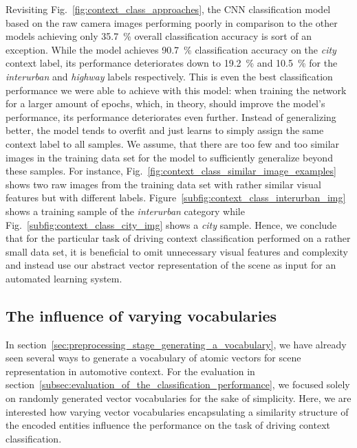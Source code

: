 Revisiting Fig.~\ref{fig:context_class_approaches}, the \ac{CNN} classification model based on the raw camera images performing poorly in comparison to the other models achieving only \SI{35.7}{\percent} overall classification accuracy is sort of an exception.
While the model achieves \SI{90.7}{\percent} classification accuracy on the \emph{city} context label, its performance deteriorates down to \SI{19.2}{\percent} and \SI{10.5}{\percent} for the \emph{interurban} and \emph{highway} labels respectively.
This is even the best classification performance we were able to achieve with this model: when training the network for a larger amount of epochs, which, in theory, should improve the model's performance, its performance deteriorates even further.
Instead of generalizing better, the model tends to overfit and just learns to simply assign the same context label to all samples.
We assume, that there are too few and too similar images in the training data set for the model to sufficiently generalize beyond these samples.
For instance, Fig.~\ref{fig:context_class_similar_image_examples} shows two raw images from the training data set with rather similar visual features but with different labels.
Figure~\ref{subfig:context_class_interurban_img} shows a training sample of the \emph{interurban} category while Fig.~\ref{subfig:context_class_city_img} shows a \emph{city} sample.
Hence, we conclude that for the particular task of driving context classification performed on a rather small data set, it is beneficial to omit unnecessary visual features and complexity and instead use our abstract vector representation of the scene as input for an automated learning system.

\subsection{The influence of varying vocabularies}%
\label{subsec:the_influence_of_varying_vocabularies}

In section~\ref{sec:preprocessing_stage_generating_a_vocabulary}, we have already seen several ways to generate a vocabulary of atomic vectors for scene representation in automotive context.
For the evaluation in section~\ref{subsec:evaluation_of_the_classification_performance}, we focused solely on randomly generated vector vocabularies for the sake of simplicity.
Here, we are interested how varying vector vocabularies encapsulating a similarity structure of the encoded entities influence the performance on the task of driving context classification.


